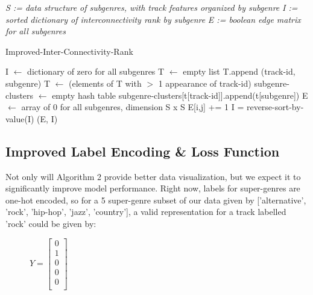 \documentclass[conference]{IEEEtran}
\begin{document}
\begin{algorithm} 
\textit{S := data structure of subgenres, with track features organized by subgenre}
\newline
\textit{I := sorted dictionary of interconnectivity rank by subgenre}
\newline
\textit{E := boolean edge matrix for all subgenres}
\newline
{}
\newline
\begin{algorithmic}[H]
\caption{Improved-Inter-Connectivity-Rank}
\STATE I $\gets$ dictionary of zero for all subgenres
\STATE T $\gets$ empty list
\STATE T.append (track-id, subgenre) 
\ENDFOR
\ENDFOR
\STATE T $\gets$ (elements of T with $>$ 1 appearance of track-id)
\STATE subgenre-clusters $\gets$ empty hash table
\STATE subgenre-clusters[t[track-id]].append(t[subgenre])
\ENDFOR
\STATE E $\gets$ array of $0$ for all subgenres, dimension S x S
\STATE E[i,j] += 1
\ENDFOR
\ENDFOR
{}
\ENDIF
\ENDFOR
\ENDFOR
\STATE I = reverse-sort-by-value(I)
\RETURN (E, I)
\end{algorithmic}
\end{algorithm}

\subsection{Improved Label Encoding \& Loss Function}
Not only will Algorithm 2 provide better data visualization, but we expect it to significantly improve model performance. Right now, labels for super-genres are one-hot encoded, so for a 5 super-genre subset of our data given by ['alternative', 'rock', 'hip-hop', 'jazz', 'country'], a valid representation for a track labelled 'rock' could be given by:

\begin{figure}[ht]
\centering
$Y=
\begin{bmatrix}
0\\
1\\
0\\
0\\
0\\
\end{bmatrix}
$
\end{figure}
\end{document}
